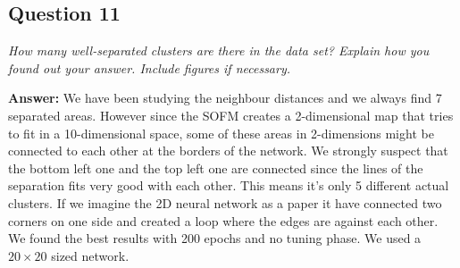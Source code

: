 \documentclass[a4paper]{article}
\begin{document}

\subsection*{Question 11}
\emph{How many well-separated clusters are there in the data set?
Explain how you found out your answer. Include figures if necessary.}


\textbf{Answer:} We have been studying the neighbour distances and we always find 7 separated areas. However since the SOFM creates a 2-dimensional map that tries to fit in a 10-dimensional space, some of these areas in 2-dimensions might be connected to each other at the borders of the network. We strongly suspect that the bottom left one and the top left one are connected since the lines of the separation fits very good with each other. This means it's only 5 different actual clusters. If we imagine the 2D neural network as a paper it have connected two corners on one side and created a loop where the edges are against each other. 
We found the best results with 200 epochs and no tuning phase. We used a $20 \times 20$ sized network.
\end{document}
